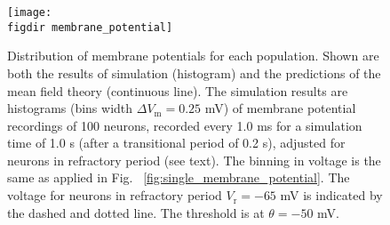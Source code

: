 \begin{figure}[tb]
    \centering
    \texttt{[image: \\figdir membrane\_potential]}
    \caption{
        Distribution of membrane potentials for each population. 
        Shown are both the results of simulation (histogram) and 
        the predictions of the mean field theory (continuous line). 
        The simulation results are histograms (bins width $\Delta V_\text{m} = 0.25$ mV) 
        of membrane potential recordings 
        of 100 neurons, recorded every 1.0 ms for a simulation time of 1.0 s 
        (after a transitional period of 0.2 s), 
        adjusted for neurons in refractory period (see text). 
        The binning in voltage is the same as applied in Fig.~%
        \ref{fig:single_membrane_potential}. 
        The voltage for neurons in refractory period $V_\text{r} = -65$ mV 
        is indicated by the dashed and dotted line. The threshold is at 
        $\theta = -50$ mV. 
    }
    \label{fig:membrane_potential}
\end{figure}



